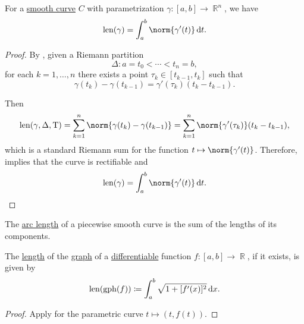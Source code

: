 \begin{proposition}\label{thm:length_of_smooth_curves}
  For a \hyperref[def:smooth_curve]{smooth curve} \( C \) with parametrization \( \gamma: [a, b] \to \BbbR^n \), we have
  \begin{equation*}
    \len(\gamma) = \int_a^b \norm{\gamma'(t)} \dl t.
  \end{equation*}
\end{proposition}
\begin{proof}
  By , given a Riemann partition
  \begin{equation*}
    \Delta: a = t_0 < \cdots < t_n = b,
  \end{equation*}
  for each \( k = 1, \ldots, n \) there exists a point \( \tau_k \in [t_{k-1}, t_k] \) such that
  \begin{equation*}
    \gamma(t_k) - \gamma(t_{k-1}) = \gamma'(\tau_k) (t_k - t_{k-1}).
  \end{equation*}

  Then
  \begin{equation*}
    \len(\gamma, \Delta, \Tau)
    =
    \sum_{k=1}^n \norm{\gamma(t_k) - \gamma(t_{k-1})}
    =
    \sum_{k=1}^n \norm{\gamma'(\tau_k)} (t_k - t_{k-1}),
  \end{equation*}
  which is a standard Riemann sum for the function \( t \mapsto \norm{\gamma'(t)} \). Therefore,  implies that the curve is rectifiable and
  \begin{equation*}
    \len(\gamma) = \int_a^b \norm{\gamma'(t)} \dl t.
  \end{equation*}
\end{proof}

\begin{corollary}\label{thm:length_of_piecewise_smooth_curves}
  The \hyperref[def:arc_length]{arc length} of a piecewise smooth curve is the sum of the lengths of its components.
\end{corollary}

\begin{corollary}\label{thm:length_of_function_graph}
  The \hyperref[def:arc_length]{length} of the \hyperref[def:multi_valued_function/graph]{graph} of a \hyperref[def:differentiability/frechet]{differentiable} function \( f: [a, b] \to \BbbR \), if it exists, is given by
  \begin{equation*}
    \len(\gph(f)) \coloneqq \int_a^b \sqrt{1 + [f'(x)]^2} \dl x.
  \end{equation*}
\end{corollary}
\begin{proof}
  Apply  for the parametric curve \( t \mapsto (t, f(t)) \).
\end{proof}

